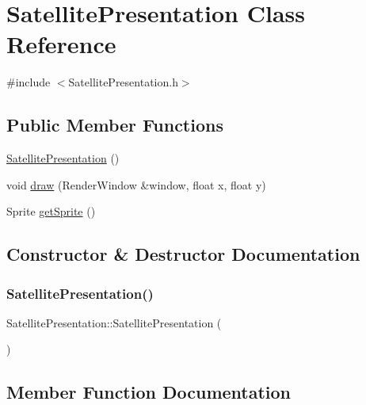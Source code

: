 \hypertarget{class_satellite_presentation}{}\section{Satellite\+Presentation Class Reference}
\label{class_satellite_presentation}


{\ttfamily \#include $<$Satellite\+Presentation.\+h$>$}

\subsection*{Public Member Functions}
\begin{DoxyCompactItemize}
\item 
\hyperlink{class_satellite_presentation_ac1d9b83f20c9f2ec34403979a00f26c5}{Satellite\+Presentation} ()
\item 
void \hyperlink{class_satellite_presentation_a140fccb83267f6f7794b26b5deda346f}{draw} (Render\+Window \&window, float x, float y)
\item 
Sprite \hyperlink{class_satellite_presentation_ac30edf373faa3704877688882e1feb3b}{get\+Sprite} ()
\end{DoxyCompactItemize}


\subsection{Constructor \& Destructor Documentation}
\mbox{\label{class_satellite_presentation_ac1d9b83f20c9f2ec34403979a00f26c5}} 
\subsubsection{\texorpdfstring{Satellite\+Presentation()}{SatellitePresentation()}}
{\footnotesize\ttfamily Satellite\+Presentation\+::\+Satellite\+Presentation (\begin{DoxyParamCaption}{ }\end{DoxyParamCaption})}



\subsection{Member Function Documentation}
\mbox{\label{class_satellite_presentation_a140fccb83267f6f7794b26b5deda346f}} 

